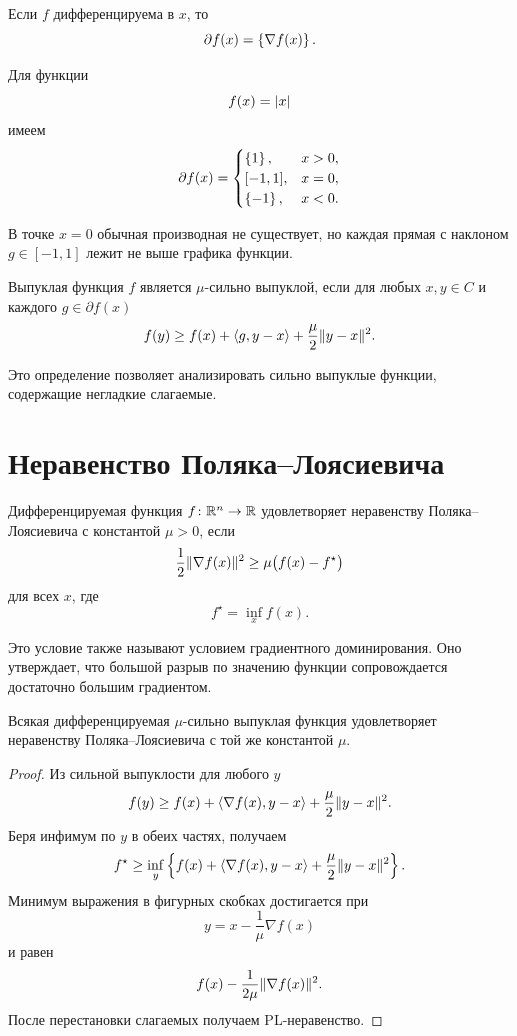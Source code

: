 Если \(f\) дифференцируема в \(x\), то
\[
    \partial f(x)=\left\{\nabla f(x)\right\}.
\]

Для функции
\[
    f(x)=\lvert x\rvert
\]
имеем
\[
    \partial f(x)
    =
    \begin{cases}
        \left\{1\right\}, & x>0,\\
        [-1,1], & x=0,\\
        \left\{-1\right\}, & x<0.
    \end{cases}
\]

В точке \(x=0\) обычная производная не существует, но каждая прямая
с наклоном \(g\in[-1,1]\) лежит не выше графика функции.

\begin{definition}
Выпуклая функция \(f\) является \(\mu\)-сильно выпуклой, если для
любых \(x,y\in C\) и каждого \(g\in\partial f(x)\)
\[
    f(y)
    \ge
    f(x)+\left\langle g,y-x \right\rangle
    +
    \frac{\mu}{2}\lVert y-x\rVert^2.
\]
\end{definition}

Это определение позволяет анализировать сильно выпуклые функции,
содержащие негладкие слагаемые.

\section{Неравенство Поляка--Лоясиевича}

\begin{definition}
Дифференцируемая функция \(f\colon\mathbb{R}^n\to\mathbb{R}\) удовлетворяет
неравенству Поляка--Лоясиевича с константой \(\mu>0\), если
\[
    \frac12\lVert\nabla f(x)\rVert^2
    \ge
    \mu\bigl(f(x)-f^\star\bigr)
\]
для всех \(x\), где
\[
    f^\star=\inf_x f(x).
\]
\end{definition}

Это условие также называют условием градиентного доминирования.
Оно утверждает, что большой разрыв по значению функции сопровождается
достаточно большим градиентом.

\begin{theorem}
Всякая дифференцируемая \(\mu\)-сильно выпуклая функция
удовлетворяет неравенству Поляка--Лоясиевича с той же константой
\(\mu\).
\end{theorem}

\begin{proof}
Из сильной выпуклости для любого \(y\)
\[
    f(y)
    \ge
    f(x)
    +
    \left\langle \nabla f(x),y-x \right\rangle
    +
    \frac{\mu}{2}\lVert y-x\rVert^2.
\]
Беря инфимум по \(y\) в обеих частях, получаем
\[
    f^\star
    \ge
    \inf_y
    \left\{
        f(x)
        +
        \left\langle \nabla f(x),y-x \right\rangle
        +
        \frac{\mu}{2}\lVert y-x\rVert^2
    \right\}.
\]
Минимум выражения в фигурных скобках достигается при
\[
    y=x-\frac1\mu\nabla f(x)
\]
и равен
\[
    f(x)-\frac{1}{2\mu}\lVert\nabla f(x)\rVert^2.
\]
После перестановки слагаемых получаем PL-неравенство.
\end{proof}

